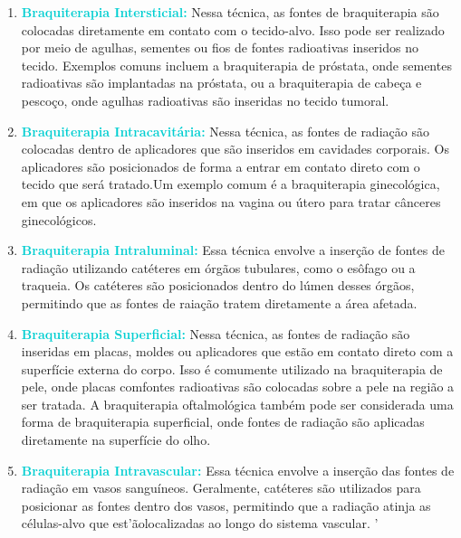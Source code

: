 \documentclass[11pt,a4paper]{article}
\newcounter{exemplo}
\begin{document}
	\begin{enumerate}
		\item \textcolor{DarkTurquoise}{\textbf{Braquiterapia Intersticial:}} Nessa técnica, as fontes de braquiterapia são colocadas diretamente em contato com o tecido-alvo. Isso pode ser realizado por meio de agulhas, sementes ou fios de fontes radioativas inseridos no tecido. Exemplos comuns incluem a braquiterapia de próstata, onde sementes radioativas são implantadas na próstata, ou a braquiterapia de cabeça e pescoço, onde agulhas radioativas são inseridas no tecido tumoral.
		
		\item \textcolor{DarkTurquoise}{\textbf{Braquiterapia Intracavitária:} }  Nessa técnica, as fontes de radiação são colocadas dentro de aplicadores que são inseridos em cavidades corporais. Os aplicadores são posicionados de forma a entrar em contato direto com o tecido que será tratado.Um exemplo comum é a braquiterapia ginecológica, em que os aplicadores são inseridos na vagina ou útero para tratar cânceres ginecológicos.
		
		\item \textcolor{DarkTurquoise}{\textbf{Braquiterapia Intraluminal:}} Essa técnica envolve a inserção de fontes de radiação utilizando catéteres em órgãos tubulares, como o esôfago ou a traqueia. Os catéteres são posicionados dentro do lúmen desses órgãos, permitindo que as fontes de raiação tratem diretamente a área afetada.
		
		\item \textcolor{DarkTurquoise}{\textbf{Braquiterapia Superficial:}} Nessa técnica, as fontes de radiação são inseridas em placas, moldes ou aplicadores que estão em contato direto com a superfície externa do corpo. Isso é comumente utilizado na braquiterapia de pele, onde placas comfontes radioativas são colocadas sobre a pele na região a ser tratada. A braquiterapia oftalmológica também pode ser considerada uma forma de braquiterapia superficial, onde fontes de radiação são aplicadas diretamente na superfície do olho.
		
		\item \textcolor{DarkTurquoise}{\textbf{Braquiterapia Intravascular:}} Essa técnica envolve a inserção das fontes de radiação em vasos sanguíneos. Geralmente, catéteres são utilizados para posicionar as fontes dentro dos vasos, permitindo que a radiação atinja as células-alvo que est'ãolocalizadas ao longo do sistema vascular.
'
	\end{enumerate}
\end{document}
